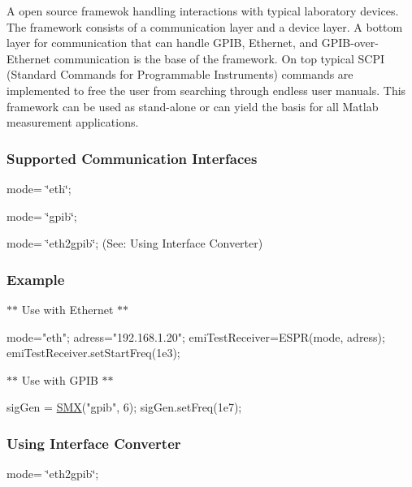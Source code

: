 A open source framewok handling interactions with typical laboratory devices. The framework consists of a communication layer and a device layer. A bottom layer for communication that can handle G\+P\+IB, Ethernet, and G\+P\+I\+B-\/over-\/\+Ethernet communication is the base of the framework. On top typical S\+C\+PI (Standard Commands for Programmable Instruments) commands are implemented to free the user from searching through endless user manuals. This framework can be used as stand-\/alone or can yield the basis for all Matlab measurement applications.

\subsubsection*{Supported Communication Interfaces}


\begin{DoxyItemize}
\item mode= \char`\"{}eth\char`\"{};
\item mode= \char`\"{}gpib\char`\"{};
\item mode= \char`\"{}eth2gpib\char`\"{}; (See\+: Using Interface Converter)
\end{DoxyItemize}

\subsubsection*{Example}

$\ast$$\ast$ Use with Ethernet $\ast$$\ast$ 
\begin{DoxyCode}
mode=\textcolor{stringliteral}{"eth"}; %
adress=\textcolor{stringliteral}{"192.168.1.20"}; %
emiTestReceiver=ESPR(mode, adress);
emiTestReceiver.setStartFreq(1e3);
\end{DoxyCode}


$\ast$$\ast$ Use with G\+P\+IB $\ast$$\ast$ 
\begin{DoxyCode}
sigGen = \hyperlink{class_s_m_x}{SMX}(\textcolor{stringliteral}{"gpib"},%
             6); %
sigGen.setFreq(1e7);
\end{DoxyCode}


\subsubsection*{Using Interface Converter}


\begin{DoxyItemize}
\item mode= \char`\"{}eth2gpib\char`\"{};
\end{DoxyItemize}

